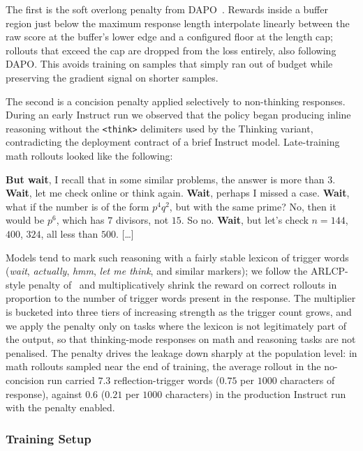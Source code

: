 \documentclass{llmxive}
\begin{document}
The first is the soft overlong penalty from DAPO~\cite{yu2025dapo}.
Rewards inside a buffer region just below the maximum response length
interpolate linearly between the raw score at the buffer's lower edge
and a configured floor at the length cap; rollouts that exceed the cap
are dropped from the loss entirely, also following DAPO. This avoids
training on samples that simply ran out of budget while preserving the
gradient signal on shorter samples.

The second is a concision penalty applied selectively to non-thinking
responses. During an early Instruct run we observed that the policy
began producing inline reasoning without the \texttt{<think>}
delimiters used by the Thinking variant, contradicting the deployment
contract of a brief Instruct model. Late-training math rollouts
looked like the following:

\begin{rolloutquote}
[\ldots] \textbf{But wait}, I recall that in some similar problems,
the answer is more than $3$. \textbf{Wait}, let me check online or
think again. \textbf{Wait}, perhaps I missed a case. \textbf{Wait},
what if the number is of the form $p^4 q^2$, but with the same prime?
No, then it would be $p^6$, which has $7$ divisors, not $15$. So no.
\textbf{Wait}, but let's check $n = 144$, $400$, $324$, all less than
$500$. [\ldots]
\end{rolloutquote}

Models tend to mark such reasoning with a fairly stable lexicon of
trigger words (\emph{wait}, \emph{actually}, \emph{hmm}, \emph{let me
think}, and similar markers); we follow the ARLCP-style penalty
of~\cite{arlcp2026} and multiplicatively shrink the reward on correct
rollouts in proportion to the number of trigger words present in the
response. The multiplier is bucketed into three tiers of increasing
strength as the trigger count grows, and we apply the penalty only on
tasks where the lexicon is not legitimately part of the output, so
that thinking-mode responses on math and reasoning tasks are not
penalised. The penalty drives the leakage down sharply at the
population level: in math rollouts sampled near the end of training,
the average rollout in the no-concision run carried $7.3$
reflection-trigger words ($0.75$ per $1000$ characters of response),
against $0.6$ ($0.21$ per $1000$ characters) in the production
Instruct run with the penalty enabled.

\subsubsection{Training Setup}
\label{sec:rl-setup}
\end{document}
